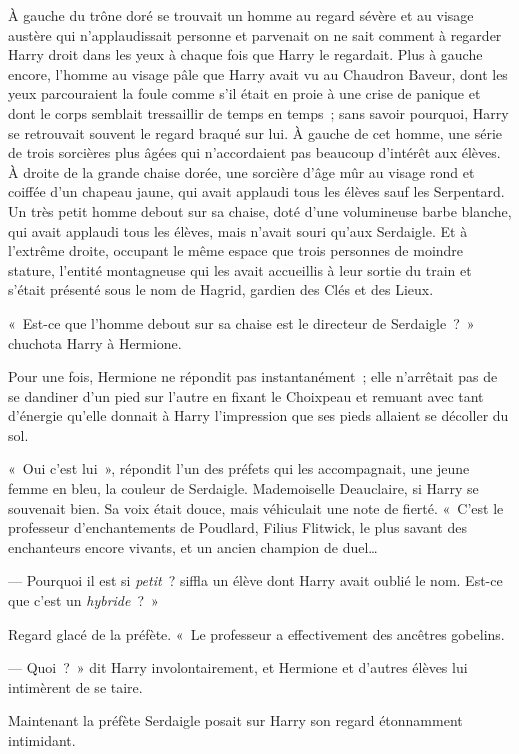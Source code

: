 À gauche du trône doré se trouvait un homme au regard sévère et au visage austère qui n'applaudissait personne et parvenait on ne sait comment à regarder Harry droit dans les yeux à chaque fois que Harry le regardait.
Plus à gauche encore, l'homme au visage pâle que Harry avait vu au Chaudron Baveur, dont les yeux parcouraient la foule comme s'il était en proie à une crise de panique et dont le corps semblait tressaillir de temps en temps~; sans savoir pourquoi, Harry se retrouvait souvent le regard braqué sur lui.
À gauche de cet homme, une série de trois sorcières plus âgées qui n'accordaient pas beaucoup d'intérêt aux élèves.
À droite de la grande chaise dorée, une sorcière d'âge mûr au visage rond et coiffée d'un chapeau jaune, qui avait applaudi tous les élèves sauf les Serpentard.
Un très petit homme debout sur sa chaise, doté d'une volumineuse barbe blanche, qui avait applaudi tous les élèves, mais n'avait souri qu'aux Serdaigle.
Et à l'extrême droite, occupant le même espace que trois personnes de moindre stature, l'entité montagneuse qui les avait accueillis à leur sortie du train et s'était présenté sous le nom de Hagrid, gardien des Clés et des Lieux.

«~Est-ce que l'homme debout sur sa chaise est le directeur de Serdaigle~?~» chuchota Harry à Hermione.

Pour une fois, Hermione ne répondit pas instantanément~; elle n'arrêtait pas de se dandiner d'un pied sur l'autre en fixant le Choixpeau et remuant avec tant d'énergie qu'elle donnait à Harry l'impression que ses pieds allaient se décoller du sol.

«~Oui c'est lui~», répondit l'un des préfets qui les accompagnait, une jeune femme en bleu, la couleur de Serdaigle.
Mademoiselle Deauclaire, si Harry se souvenait bien.
Sa voix était douce, mais véhiculait une note de fierté.
«~C'est le professeur d'enchantements de Poudlard, Filius Flitwick, le plus savant des enchanteurs encore vivants, et un ancien champion de duel…

--- Pourquoi il est si \emph{petit}~? siffla un élève dont Harry avait oublié le nom. Est-ce que c'est un \emph{hybride}~?~»

Regard glacé de la préfète. «~Le professeur a effectivement des ancêtres gobelins.

--- Quoi~?~» dit Harry involontairement, et Hermione et d'autres élèves lui intimèrent de se taire.

Maintenant la préfète Serdaigle posait sur Harry son regard étonnamment intimidant.

